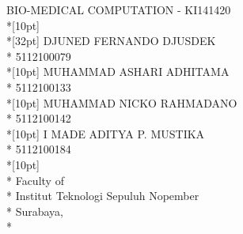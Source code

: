\newpage

	\sffamily
	\thispagestyle{empty}
	{ \noindent BIO-MEDICAL COMPUTATION - KI141420 }\\*[10pt] 
	{\large\textbf{\MakeUppercase{\judul}}} \\*[32pt]
	\MakeUppercase{\penulisSatu Djuned Fernando Djusdek} \\*
	5112100079 \nrpSatu \\*[10pt]
	\MakeUppercase{\penulisDua Muhammad Ashari Adhitama} \\*
	5112100133 \nrpDua \\*[10pt]
	\MakeUppercase{\penulisTiga Muhammad Nicko Rahmadano} \\*
	5112100142 \nrpTiga \\*[10pt]
	\MakeUppercase{\penulisEmpat I Made Aditya P. Mustika} \\*
	5112100184 \nrpEmpat \\*[10pt]
	\MakeUppercase{\jurusan} \\*
	Faculty of \fakultas \\*
	Institut Teknologi Sepuluh Nopember \\*
	Surabaya, \tahun \\*
	\rmfamily
	\normalsize
	\restoregeometry
	\color{black}
	\cleardoublepage
